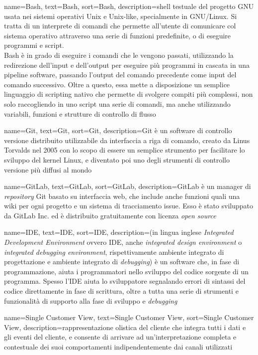 {
	name=Bash,
	text=Bash,
	sort=Bash,
	description={shell testuale del progetto GNU usata nei sistemi operativi Unix e Unix-like, specialmente in GNU/Linux. Si tratta di un interprete di comandi che permette all'utente di comunicare col sistema operativo attraverso una serie di funzioni predefinite, o di eseguire programmi e script.\\		
	Bash è in grado di eseguire i comandi che le vengono passati, utilizzando la redirezione dell'input e dell'output per eseguire più programmi in cascata in una pipeline software, passando l'output del comando precedente come input del comando successivo.
	Oltre a questo, essa mette a disposizione un semplice linguaggio di scripting nativo che permette di svolgere compiti più complessi, non solo raccogliendo in uno script una serie di comandi, ma anche utilizzando variabili, funzioni e strutture di controllo di flusso}
}

{
	name=Git,
	text=Git,
	sort=Git,
	description={Git è un software di controllo versione distribuito utilizzabile da interfaccia a riga di comando, creato da Linus Torvalds nel 2005 con lo scopo di essere un semplice strumento per facilitare lo sviluppo del kernel Linux, e diventato poi uno degli strumenti di controllo versione più diffusi al mondo}
}

{
	name=GitLab,
	text=GitLab,
	sort=GitLab,
	description={GitLab è un manager di \textit{repository} Git basato su interfaccia web, che include anche funzioni quali una wiki per ogni progetto e un sistema di tracciamento issue. Esso è stato sviluppato da GitLab Inc. ed è distribuito gratuitamente con licenza \textit{open source}}
}

{
	name=IDE,
	text=IDE,
	sort=IDE,
	description={(in lingua inglese \textit{Integrated Development Environment} ovvero IDE, anche \textit{integrated design environment} o \textit{integrated debugging environment}, rispettivamente ambiente integrato di progettazione e ambiente integrato di \textit{debugging}) è un software che, in fase di programmazione, aiuta i programmatori nello sviluppo del codice sorgente di un programma. Spesso l’IDE aiuta lo sviluppatore segnalando errori di sintassi del codice direttamente in fase di scrittura, oltre a tutta una serie di strumenti e funzionalità di supporto alla fase di sviluppo e \textit{debugging}}
}

{
	name=Single Customer View,
	text=Single Customer View,
	sort=Single Customer View,
	description={rappresentazione olistica del cliente che integra tutti i dati e gli eventi del cliente, e consente di arrivare ad un’interpretazione completa e contestuale dei suoi comportamenti indipendentemente dai canali utilizzati}
}

